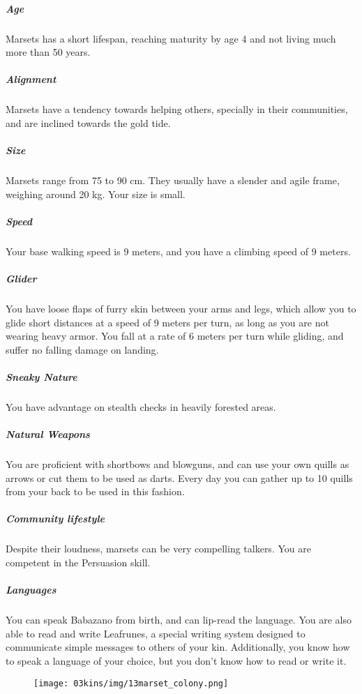 \subparagraph{Age} Marsets has a short lifespan, reaching maturity by age 4 and not living much more than 50 years.

\subparagraph{Alignment} Marsets have a tendency towards helping others, specially in their communities, and are inclined towards the gold tide.

\subparagraph{Size} Marsets range from 75 to 90 cm.
They usually have a slender and agile frame, weighing around 20 kg.
Your size is small.

\subparagraph{Speed} Your base walking speed is 9 meters, and you have a climbing speed of 9 meters.

\subparagraph{Glider} You have loose flaps of furry skin between your arms and legs, which allow you to glide short distances at a speed of 9 meters per turn, as long as you are not wearing heavy armor.
You fall at a rate of 6 meters per turn while gliding, and suffer no falling damage on landing.

\subparagraph{Sneaky Nature} You have advantage on stealth checks in heavily forested areas.

\subparagraph{Natural Weapons} You are proficient with shortbows and blowguns, and can use your own quills as arrows or cut them to be used as darts.
Every day you can gather up to 10 quills from your back to be used in this fashion.

\subparagraph{Community lifestyle} Despite their loudness, marsets can be very compelling talkers.
You are competent in the Persuasion skill.

\subparagraph{Languages} You can speak Babazano from birth, and can lip-read the language.
You are also able to read and write Leafrunes, a special writing system designed to communicate simple messages to others of your kin.
Additionally, you know how to speak a language of your choice, but you don't know how to read or write it.

\begin{figure}[!b]
    \centering
    \texttt{[image: 03kins/img/13marset\_colony.png]}
\end{figure}


\newpage
